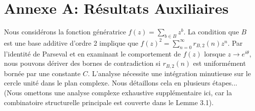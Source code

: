 \documentclass[12pt, a4paper]{article}
\theoremstyle{definition}
\begin{document}
\newpage
\section{Annexe A: Résultats Auxiliaires}
Nous considérons la fonction génératrice $f(z) = \sum_{b \in B} z^b$.
La condition que $B$ est une base additive d'ordre 2 implique que $f(z)^2 = \sum_{n=0}^{\infty} r_{B,2}(n) z^n$.
Par l'identité de Parseval et en examinant le comportement de $f(z)$ lorsque $z \to e^{i\theta}$, nous pouvons dériver des bornes de contradiction si $r_{B,2}(n)$ est uniformément bornée par une constante $C$.
L'analyse nécessite une intégration minutieuse sur le cercle unité dans le plan complexe. Nous détaillons cela en plusieurs étapes...
(Nous omettons une analyse complexe exhaustive supplémentaire ici, car la combinatoire structurelle principale est couverte dans le Lemme 3.1).
\end{document}
